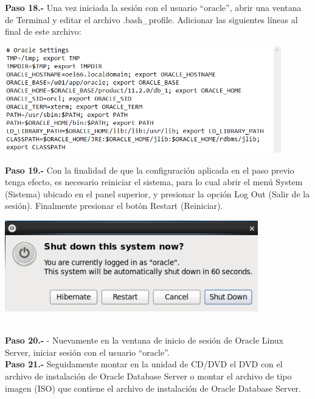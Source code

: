 \begin{enumerate}
\textbf {Paso 18.-} Una vez iniciada la sesión con el usuario “oracle”, abrir una ventana de Terminal y editar el archivo .bash_profile. Adicionar las siguientes líneas al final de este archivo:

\begin{center}
  \includegraphics[width=12cm]{Imagenes/Oracle_Database/Paso_18.png}
\end{center}
\break

\textbf {Paso 19.-} Con la finalidad de que la configuración aplicada en el paso previo tenga efecto, es necesario reiniciar el sistema, para lo cual abrir el menú System (Sistema) ubicado en el panel superior, y presionar la opción Log Out (Salir de la sesión). Finalmente presionar el botòn Restart (Reiniciar).

\begin{center}
  \includegraphics[width=11cm]{Imagenes/Oracle_Database/Paso_19.png}
\end{center}
\vspace{12pt}\\

\textbf {Paso 20.-} - Nuevamente en la ventana de inicio de sesión de Oracle Linux Server, iniciar sesión con el usuario “oracle”.
\vspace{12pt}\\

\textbf {Paso 21.-} Seguidamente montar en la unidad de CD/DVD el DVD con el archivo de instalación de Oracle Database Server o montar el archivo de tipo imagen (ISO) que contiene el archivo de instalación de Oracle Database Server.
\vspace{12pt}\\


\end{enumerate}

